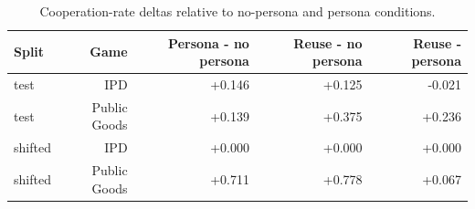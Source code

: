 \begin{table}[t]
\centering
\small
\begin{tabular}{lrrrr}
\toprule
Split & Game & Persona - no persona & Reuse - no persona & Reuse - persona \\
\midrule
test & IPD & +0.146 & +0.125 & -0.021 \\
test & Public Goods & +0.139 & +0.375 & +0.236 \\
shifted & IPD & +0.000 & +0.000 & +0.000 \\
shifted & Public Goods & +0.711 & +0.778 & +0.067 \\
\bottomrule
\end{tabular}
\caption{Cooperation-rate deltas relative to no-persona and persona conditions.}
\label{tab:game-deltas}
\end{table}
